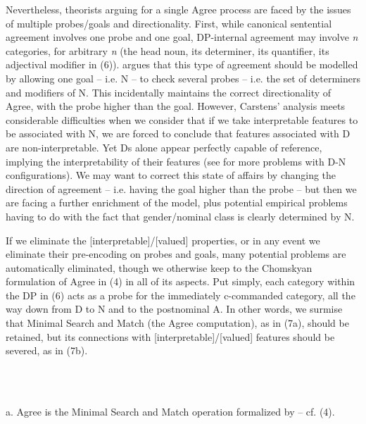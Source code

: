 \documentclass[output=paper]{langsci/langscibook}
\begin{document}
\begin{styleSfondomedioiColorexxi}
Nevertheless, theorists arguing for a single Agree process are faced by the issues of multiple probes/goals and directionality. First, while canonical sentential agreement involves one probe and one goal, DP-internal agreement may involve \textit{n} categories, for arbitrary \textit{n} (the head noun, its determiner, its quantifier, its adjectival modifier in (6)). \citet{Carstens2001} argues that this type of agreement should be modelled by allowing one goal – i.e. N – to check several probes – i.e. the set of determiners and modifiers of N. This incidentally maintains the correct directionality of Agree, with the probe higher than the goal. However, Carstens’ analysis meets considerable difficulties when we consider that if we take interpretable features to be associated with N, we are forced to conclude that features associated with D are non-interpretable. Yet Ds alone appear perfectly capable of reference, implying the interpretability of their features (see \citealt{Danon2010} for more problems with D-N configurations). We may want to correct this state of affairs by changing the direction of agreement – i.e. having the goal higher than the probe – but then we are facing a further enrichment of the model, plus potential empirical problems having to do with the fact that gender/nominal class is clearly determined by N.
\end{styleSfondomedioiColorexxi}

\begin{styleSfondomedioiColorexxi}
If we eliminate the [interpretable]/[valued] properties, or in any event we eliminate their pre-encoding on probes and goals, many potential problems are automatically eliminated, though we otherwise keep to the Chomskyan formulation of Agree in (4) in all of its aspects. Put simply, each category within the DP in (6) acts as a probe for the immediately c-commanded category, all the way down from D to N and to the postnominal A. In other words, we surmise that Minimal Search and Match (the Agree computation), as in (7a), should be retained, but its connections with [interpretable]/[valued] features should be severed, as in (7b). 
\end{styleSfondomedioiColorexxi}

\begin{styleSfondomedioiColorexxi}
\ea%
    \label{ex:key:7}
    \gll\\
        \\
    \glt
    \z

          a.  Agree is the Minimal Search and Match operation formalized by \citet{Chomsky2000} – cf. (4). 
\end{styleSfondomedioiColorexxi}
\end{document}
